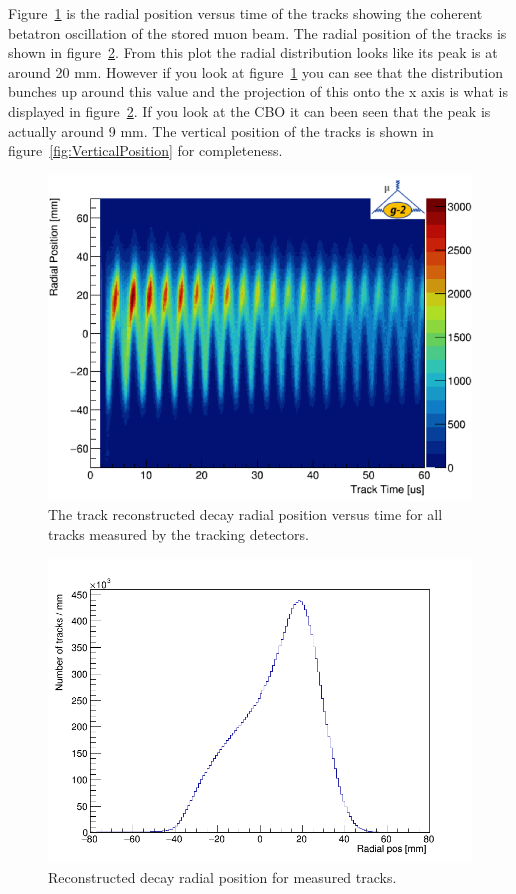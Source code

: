 Figure~\ref{fig:trackercbo} is the radial position versus time of the tracks showing the coherent betatron oscillation of the stored muon beam. The radial position of the tracks is shown in figure~\ref{fig:RadialPosition_}. From this plot the radial distribution looks like its peak is at around 20 mm. However if you look at figure~\ref{fig:trackercbo} you can see that the distribution bunches up around this value and the projection of this onto the x axis is what is displayed in figure~\ref{fig:RadialPosition_}. If you look at the CBO it can been seen that the peak is actually around 9 mm. The vertical position of the tracks is shown in figure~\ref{fig:VerticalPosition} for completeness.

\begin{figure}[th]
\centering
\includegraphics[scale=0.9]{Figures/trackercbo.png}
\decoRule
\caption{The track reconstructed decay radial position versus time for all tracks measured by the tracking detectors.}
\label{fig:trackercbo}
\end{figure}

\begin{figure}[th]
\centering
\includegraphics[scale=0.4]{Figures/RadialPosition_.png}
\decoRule
\caption{Reconstructed decay radial position for measured tracks.}
\label{fig:RadialPosition_}
\end{figure}

